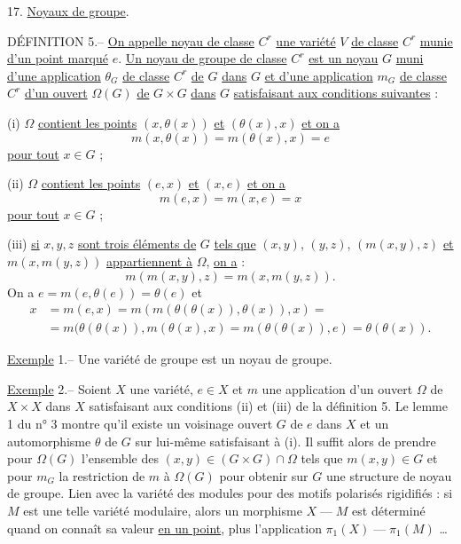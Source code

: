 17. \uline{Noyaux de groupe}.

DÉFINITION 5.-- \uline{On appelle noyau de classe} $C^r$ \uline{une variété} $V$ \uline{de classe} $C^r$ \uline{munie
d'un point marqué} $e$. \uline{Un noyau de groupe de classe} $C^r$ \uline{est un noyau} $G$ \uline{muni d'une
application} $\theta_G$ \uline{de classe} $C^r$ \uline{de} $G$ \uline{dans} $G$ \uline{et d'une application} $m_G$ \uline{de classe} $C^r$
\uline{d'un ouvert} $\Omega(G)$ \uline{de} $G\times G$ \uline{dans} $G$ \uline{satisfaisant aux conditions suivantes} :

(i) $\Omega$ \uline{contient les points} $(x,\theta(x))$ \uline{et} $(\theta(x),x)$ \uline{et on a}
\[
\tag{36} m(x,\theta(x))=m(\theta(x),x)=e
\]
\uline{pour tout} $x\in G$ ;

(ii) $\Omega$ \uline{contient les points} $(e,x)$ \uline{et} $(x,e)$ \uline{et on a}
\[
\tag{37} m(e,x)=m(x,e)=x
\]
\uline{pour tout} $x\in G$ ;

(iii) \uline{si} $x,y,z$ \uline{sont trois éléments de} $G$ \uline{tels que} $(x,y)$, $(y,z)$, $(m(x,y),z)$
\uline{et} $m(x,m(y,z))$ \uline{appartiennent à} $\Omega$, \uline{on a} :
\[
\tag{38} m(m(x,y),z)=m(x,m(y,z)).
\]
On a $e=m(e,\theta(e))=\theta(e)$ et
\[
\begin{aligned}
x&=m(e,x)=m(m(\theta(\theta(x)),\theta(x)),x)=\\
&=m(\theta(\theta(x)),m(\theta(x),x)=m(\theta(\theta(x)),e)=\theta(\theta(x)).
\end{aligned}
\]

\uline{Exemple} 1.-- Une variété de groupe est un noyau de groupe.

\uline{Exemple} 2.-- Soient $X$ une variété, $e\in X$ et $m$ une application d'un ouvert $\Omega$ de $X\times X$
dans $X$ satisfaisant aux conditions (ii) et (iii) de la définition 5. Le lemme 1
du n° 3 montre qu'il existe un voisinage ouvert $G$ de $e$ dans $X$ et un automorphisme $\theta$
de $G$ sur lui-même satisfaisant à (i). Il suffit alors de prendre pour $\Omega(G)$
l'ensemble des $(x,y)\in(G\times G)\cap\Omega$ tels que $m(x,y)\in G$ et pour $m_G$ la restriction de $m$
à $\Omega(G)$ pour obtenir sur $G$ une structure de noyau de groupe.
Lien avec la variété des modules pour des
motifs polarisés rigidifiés : si  $M$ est
une telle variété modulaire, alors
un morphisme $X\mathrel{\text{---}}M$ est déterminé
quand on connaît sa valeur \uline{en un point},
plus l'application $\pi_1(X)\mathrel{\text{---}}\pi_1(M)$ \ldots

